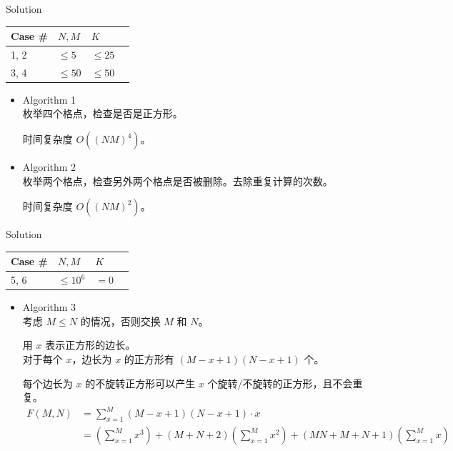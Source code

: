 \documentclass[UTF8]{beamer}
\begin{document}
\begin{frame}{Solution}

\begin{tabularx}{\textwidth}{X|X|X|X} \hline
Case \# & $N, M$ & $K$ \\ \hline \hline
1, 2   & $\leq 5$    & $\leq 25$            \\ \hline
3, 4   & $\leq 50$   & $\leq 50$            \\ \hline
\end{tabularx}
\begin{itemize}
    \item Algorithm 1 \\
        枚举四个格点，检查是否是正方形。

        时间复杂度 $O((NM)^4)$。

    \pause\item Algorithm 2 \\
        枚举两个格点，检查另外两个格点是否被删除。去除重复计算的次数。

        时间复杂度 $O((NM)^2)$。
\end{itemize}

\end{frame}

\begin{frame}{Solution}

\begin{tabularx}{\textwidth}{X|X|X|X} \hline
Case \# & $N, M$ & $K$ \\ \hline \hline
5, 6   & $\leq 10^6$ & $= 0$                \\ \hline
\end{tabularx}
\begin{itemize}
    \item Algorithm 3 \\
        考虑 $M \leq N$ 的情况，否则交换 $M$ 和 $N$。

        \pause
        用 $x$ 表示正方形的边长。 \\
        对于每个 $x$，边长为 $x$ 的正方形有 $(M - x + 1)(N - x + 1)$ 个。

        \pause
        每个边长为 $x$ 的不旋转正方形可以产生 $x$ 个旋转/不旋转的正方形，且不会重复。
        \begin{align*}
            F(M, N) &= \sum_{x = 1}^{M} (M - x + 1)(N - x + 1) \cdot x \\
                    &= (\sum_{x = 1}^{M} x^3) +
                        (M + N + 2) (\sum_{x = 1}^{M} x^2) +
                        (MN + M + N + 1) (\sum_{x = 1}^{M} x)
        \end{align*}
\end{itemize}

\end{frame}
\end{document}
